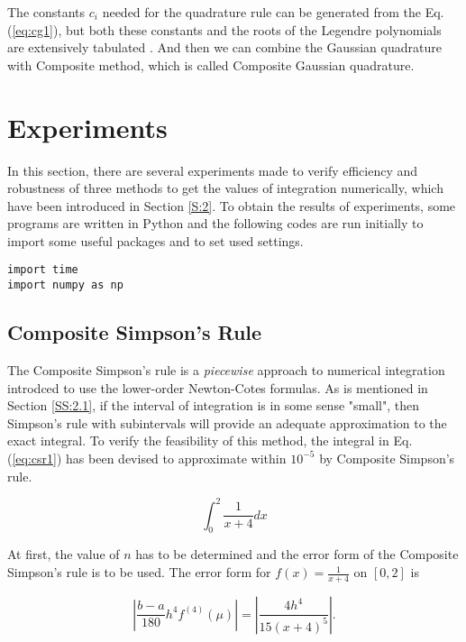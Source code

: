 \documentclass[preprint,12pt]{elsarticle}
\begin{document}
The constants $c_i$ needed for the quadrature rule can be generated from the Eq. (\ref{eq:cg1}), but both these constants and the roots of the Legendre polynomials are extensively tabulated \cite{burden:2001na}. And then we can combine the Gaussian quadrature with Composite method, which is called Composite Gaussian quadrature.

\section{Experiments}
\label{S:3}

In this section, there are several experiments made to verify efficiency and robustness of three methods to get the values of integration numerically, which have been introduced in Section \ref{S:2}. To obtain the results of experiments, some programs are written in Python and the following codes are run initially to import some useful packages and to set used settings.

\begin{lstlisting}
import time
import numpy as np
\end{lstlisting}

\subsection{Composite Simpson's Rule}
\label{SS:3.1}

The Composite Simpson's rule is a \textit{piecewise} approach to numerical integration introdced to use the lower-order Newton-Cotes formulas. As is mentioned in Section \ref{SS:2.1}, if the interval of integration is in some sense "small", then Simpson's rule with subintervals will provide an adequate approximation to the exact integral. To verify the feasibility of this method, the integral in Eq. (\ref{eq:csr1}) has been devised to approximate within $10^{-5}$ by Composite Simpson's rule.

\begin{equation}
\label{eq:csr1}
    \int^{2}_{0} \frac{1}{x+4} dx
\end{equation}

At first, the value of $n$ has to be determined and the error form of the Composite Simpson's rule is to be used. The error form for $f(x)=\frac{1}{x+4}$ on $[0,2]$ is

\begin{equation}
    \left|\frac{b-a}{180}h^{4}f^{(4)}(\mu)\right|=\left|\frac{4h^{4}}{15(x+4)^5}\right|.
\end{equation}
\end{document}
